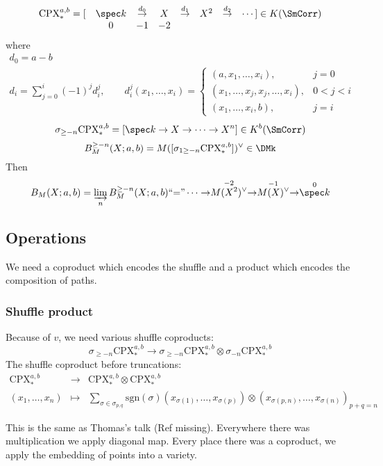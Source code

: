 \[
\begin{array}{rccccccl}
\mathrm{CPX}^{a,b}_* = [ & \spec k & \stackrel{d_0}{\to} & X & \stackrel{d_1}{\to} & X^2 & \stackrel{d_2}{\to} & \cdots ] \in K(\SmCorr) \\
& 0 & -1 & -2 & &
\end{array}
\]
where
\begin{eqnarray*}
d_0 = a - b \\
d_i = \sum_{j=0}^{i} (-1)^j d_i^j, \qquad d_i^j(x_1, \ldots, x_i) = \left\{ \begin{array}{ll}
(a,x_1, \ldots, x_i), & j=0 \\
(x_1, \ldots, x_j, x_j, \ldots, x_i), & 0 < j < i \\
(x_1, \ldots, x_i, b), & j=i
\end{array} \right.
\end{eqnarray*}
\[
\sigma_{\geq -n} \mathrm{CPX}_*^{a,b} = [ \spec k \to X \to \cdots \to X^n] \in K^b(\SmCorr)
\]
\[
B_M^{\geq -n}(X;a,b) = M([\sigma_{1 \geq -n} \mathrm{CPX}_*^{a,b}])^{\vee} \in \DMk
\]
Then
\[
B_M(X;a,b) = \varinjlim_n B^{\geq -n}_M(X;a,b) \textrm{``$=$''} \cdots \to \stackrel{-2}{M(X^2)^{\vee}} \to \stackrel{-1}{M(X)^{\vee}} \to \stackrel{0}{\spec k}
\]

\subsection{Operations}
We need a coproduct which encodes the shuffle and a product which encodes the composition of paths.
\subsubsection{Shuffle product}
Because of $v$, we need various shuffle coproducts:
\[
\sigma_{\geq -n} \mathrm{CPX}_*^{a,b} \to \sigma_{\geq -n} \mathrm{CPX}_*^{a,b} \otimes \sigma_{-n} \mathrm{CPX}_*^{a,b}
\]
The shuffle coproduct before truncations:
\[
\begin{array}{rcl}
\mathrm{CPX}_*^{a,b} & \to & \mathrm{CPX}_*^{a,b} \otimes \mathrm{CPX}_*^{a,b} \\
(x_1, \ldots, x_n) & \mapsto & \sum_{\sigma \in \sigma_{p,q}} \mathrm{sgn}(\sigma)(x_{\sigma(1)}, \ldots, x_{\sigma(p)}) \otimes (x_{\sigma(p,n)}, \ldots, x_{\sigma(n)})_{p+q=n}
\end{array}
\]

This is the same as Thomas's talk (Ref missing). Everywhere there was multiplication we apply diagonal map. Every place there was a coproduct, we apply the embedding of points into a variety.

